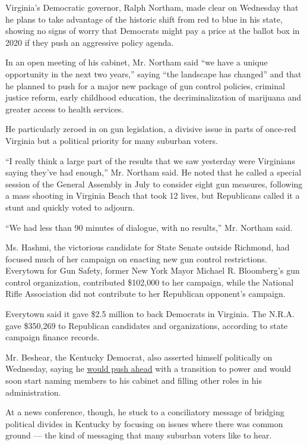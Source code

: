 Virginia's Democratic governor, Ralph Northam, made clear on Wednesday
that he plans to take advantage of the historic shift from red to blue
in his state, showing no signs of worry that Democrats might pay a price
at the ballot box in 2020 if they push an aggressive policy agenda.

In an open meeting of his cabinet, Mr. Northam said ``we have a unique
opportunity in the next two years,'' saying ``the landscape has
changed'' and that he planned to push for a major new package of gun
control policies, criminal justice reform, early childhood education,
the decriminalization of marijuana and greater access to health
services.

He particularly zeroed in on gun legislation, a divisive issue in parts
of once-red Virginia but a political priority for many suburban voters.

``I really think a large part of the results that we saw yesterday were
Virginians saying they've had enough,'' Mr. Northam said. He noted that
he called a special session of the General Assembly in July to consider
eight gun measures, following a mass shooting in Virginia Beach that
took 12 lives, but Republicans called it a stunt and quickly voted to
adjourn.

``We had less than 90 minutes of dialogue, with no results,'' Mr.
Northam said.

Ms. Hashmi, the victorious candidate for State Senate outside Richmond,
had focused much of her campaign on enacting new gun control
restrictions. Everytown for Gun Safety, former New York Mayor Michael R.
Bloomberg's gun control organization, contributed \$102,000 to her
campaign, while the National Rifle Association did not contribute to her
Republican opponent's campaign.

Everytown said it gave \$2.5 million to back Democrats in Virginia. The
N.R.A. gave \$350,269 to Republican candidates and organizations,
according to state campaign finance records.

Mr. Beshear, the Kentucky Democrat, also asserted himself politically on
Wednesday, saying he
\href{https://www.nytimes3xbfgragh.onion/2019/11/05/us/politics/ky-va-ms-elections-recap.html}{would
push ahead} with a transition to power and would soon start naming
members to his cabinet and filling other roles in his administration.

At a news conference, though, he stuck to a conciliatory message of
bridging political divides in Kentucky by focusing on issues where there
was common ground --- the kind of messaging that many suburban voters
like to hear.


